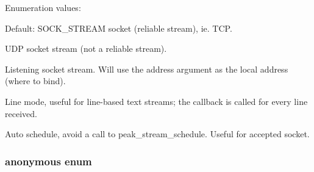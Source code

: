 \begin{Desc}
\item[Enumeration values: ]\par
\begin{description}
\item[{\em 
\hypertarget{group__stream_gga2a5}{
PEAK\_\-STREAM\_\-OPT\_\-DEFAULT}
\label{group__stream_gga2a5}
}]Default: SOCK\_\-STREAM socket (reliable stream), ie. TCP. \item[{\em 
\hypertarget{group__stream_gga2a6}{
PEAK\_\-STREAM\_\-OPT\_\-DGRAM}
\label{group__stream_gga2a6}
}]UDP socket stream (not a reliable stream). \item[{\em 
\hypertarget{group__stream_gga2a7}{
PEAK\_\-STREAM\_\-OPT\_\-LISTEN}
\label{group__stream_gga2a7}
}]Listening socket stream. Will use the address argument as the local address (where to bind). \item[{\em 
\hypertarget{group__stream_gga2a8}{
PEAK\_\-STREAM\_\-OPT\_\-LINEMODE}
\label{group__stream_gga2a8}
}]Line mode, useful for line-based text streams; the callback is called for every line received. \item[{\em 
\hypertarget{group__stream_gga2a9}{
PEAK\_\-STREAM\_\-OPT\_\-AUTOSCHEDULE}
\label{group__stream_gga2a9}
}]Auto schedule, avoid a call to peak\_\-stream\_\-schedule. Useful for accepted socket. \end{description}
\end{Desc}

\hypertarget{group__stream_ga3}{
\subsubsection["@5]{\setlength{\rightskip}{0pt plus 5cm}anonymous enum}}
\label{group__stream_ga3}



